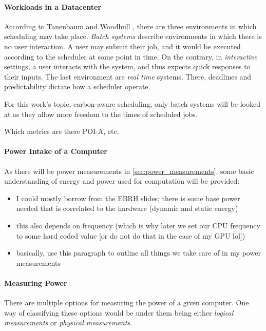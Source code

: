 \paragraph{Workloads in a Datacenter} According to Tanenbaum and Woodhull \cite{tanenbaum_operating_2006}, there are three environments in which scheduling may take place. \emph{Batch systems} describe environments in which there is no user interaction.
A user may submit their job, and it would be executed according to the scheduler at some point in time. 
On the contrary, in \emph{interactive} settings, a user interacts with the system, and thus expects quick responses to their inputs. 
The last environment are \emph{real time} systems. There, deadlines and predictability dictate how a scheduler operate.

For this work's topic, carbon-aware scheduling, only batch systems will be looked at as they allow more freedom to the times of scheduled jobs. 


Which metrics are there POI-A, etc.

\paragraph{Power Intake of a Computer}
As there will be power measurements in \ref{sec:power_measurements}, some basic understanding of energy and power used for computation will be provided:
\begin{itemize}
    \item I could mostly borrow from the EBRH slides; there is some base power needed that is correlated to the hardware (dynamic and static energy)
    \item this also depends on frequency (which is why later we set our CPU frequency to some hard coded value [or do not do that in the case of my GPU lol])
    \item basically, use this paragraph to outline all things we take care of in my power measurements
\end{itemize}

\paragraph{Measuring Power}

There are multiple options for measuring the power of a given computer. One way of classifying these options would be under them being either \emph{logical measurements} or \emph{physical measurements}.

